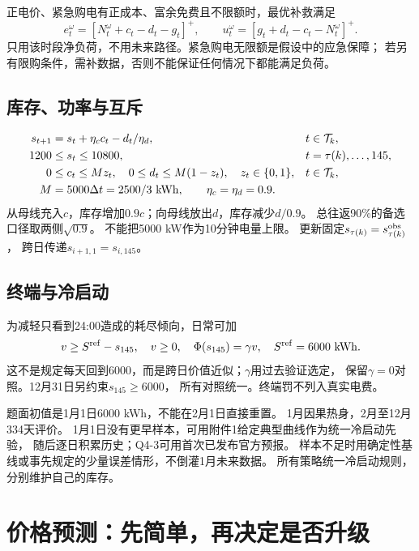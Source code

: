 \documentclass[UTF8,11pt]{ctexart}
\newcommand{\pos}[1]{\left[#1\right]^+}
\begin{document}
正电价、紧急购电有正成本、富余免费且不限额时，最优补救满足
\begin{equation}\label{eq:recourse}
 e_t^\omega=\pos{N_t^\omega+c_t-d_t-g_t},\qquad
 u_t^\omega=\pos{g_t+d_t-c_t-N_t^\omega}.
\end{equation}
只用该时段净负荷，不用未来路径。紧急购电无限额是假设中的应急保障；
若另有限购条件，需补数据，否则不能保证任何情况下都能满足负荷。

\subsection{库存、功率与互斥}
\begin{align}
 s_{t+1}&=s_t+\eta_c c_t-d_t/\eta_d,
            &&t\in\mathcal T_k,\label{eq:stock}\\
 1200&\leq s_t\leq10800,
            &&t=\tau(k),\ldots,145,\label{eq:capacity}\\
 0&\leq c_t\leq Mz_t,\quad
 0\leq d_t\leq M(1-z_t),\quad z_t\in\{0,1\},
            &&t\in\mathcal T_k,\label{eq:mode}\\
 M&=5000\Delta t=2500/3\ {\rm kWh},\qquad
 \eta_c=\eta_d=0.9.
\end{align}
从母线充入$c$，库存增加$0.9c$；向母线放出$d$，库存减少$d/0.9$。
总往返90\%的备选口径取两侧$\sqrt{0.9}$。
不能把5000 kW作为10分钟电量上限。
更新固定$s_{\tau(k)}=s^{\rm obs}_{\tau(k)}$，
跨日传递$s_{i+1,1}=s_{i,145}$。

\subsection{终端与冷启动}
为减轻只看到24:00造成的耗尽倾向，日常可加
\begin{equation}\label{eq:terminal}
 v\geq S^{\rm ref}-s_{145},\quad v\geq0,\quad
 \Phi(s_{145})=\gamma v,\quad S^{\rm ref}=6000\ {\rm kWh}.
\end{equation}
这不是规定每天回到6000，而是跨日价值近似；$\gamma$用过去验证选定，
保留$\gamma=0$对照。12月31日另约束$s_{145}\geq6000$，
所有对照统一。终端罚不列入真实电费。

题面初值是1月1日6000 kWh，不能在2月1日直接重置。
1月因果热身，2月至12月334天评价。
1月1日没有更早样本，可用附件1给定典型曲线作为统一冷启动先验，
随后逐日积累历史；Q4-3可用首次已发布官方预报。
样本不足时用确定性基线或事先规定的少量误差情形，不倒灌1月未来数据。
所有策略统一冷启动规则，分别维护自己的库存。

\section{价格预测：先简单，再决定是否升级}
\end{document}
